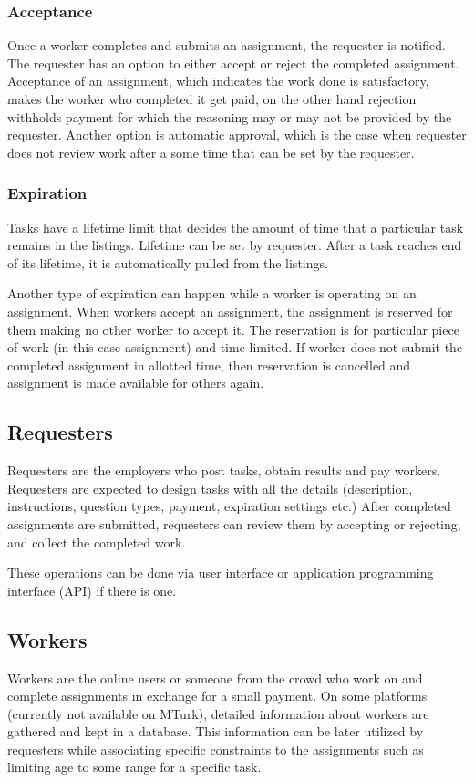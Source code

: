 \subsubsection{Acceptance}
Once a worker completes and submits an assignment, the requester is notified. 
The requester has an option to either accept or reject the completed assignment. 
Acceptance of an assignment, which indicates the work done is satisfactory, 
makes the worker who completed it get paid, on the other hand rejection withholds 
payment for which the reasoning may or may not be provided by the requester. 
Another option is automatic approval, which is the case when requester does not 
review work after a some time that can be set by the requester.

\subsubsection{Expiration}
Tasks have a lifetime limit that decides the amount of time that a particular task 
remains in the listings. Lifetime can be set by requester. After a task reaches 
end of its lifetime, it is automatically pulled from the listings.

Another type of expiration can happen while a worker is operating on an assignment. 
When workers accept an assignment, the assignment is reserved for them making 
no other worker to accept it. The reservation is for particular piece of work 
(in this case assignment) and time-limited. If worker does not submit the completed 
assignment in allotted time, then reservation is cancelled and assignment is 
made available for others again.

\subsection{Requesters}
Requesters are the employers who post tasks, obtain results and pay workers. 
Requesters are expected to design tasks with all the details (description, instructions, 
question types, payment, expiration settings etc.) After completed assignments 
are submitted, requesters can review them by accepting or rejecting, 
and collect the completed work. 

These operations can be done via user interface or application programming 
interface (API) if there is one. 

\subsection{Workers}
Workers are the online users or someone from the crowd who work on and 
complete assignments in exchange for a small payment. On some platforms 
(currently not available on MTurk), detailed information about workers are gathered 
and kept in a database. This information can be later utilized by requesters while 
associating specific constraints to the assignments such as limiting age to some 
range for a specific task. 

